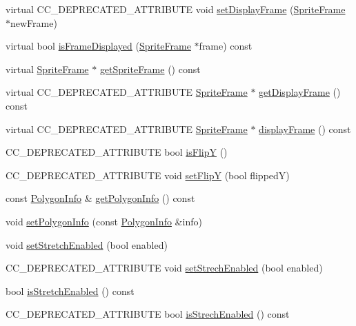 \begin{DoxyCompactItemize}
\item 
virtual C\+C\+\_\+\+D\+E\+P\+R\+E\+C\+A\+T\+E\+D\+\_\+\+A\+T\+T\+R\+I\+B\+U\+TE void \hyperlink{classSprite_adb32a70df269965d534e49600ab9ff13}{set\+Display\+Frame} (\hyperlink{classSpriteFrame}{Sprite\+Frame} $\ast$new\+Frame)
\item 
virtual bool \hyperlink{classSprite_a9fba3e039bf9d72552848a201b4a451f}{is\+Frame\+Displayed} (\hyperlink{classSpriteFrame}{Sprite\+Frame} $\ast$frame) const
\item 
virtual \hyperlink{classSpriteFrame}{Sprite\+Frame} $\ast$ \hyperlink{classSprite_a6921c3ed0ee8e8349e3581d8fbf496c2}{get\+Sprite\+Frame} () const
\item 
virtual C\+C\+\_\+\+D\+E\+P\+R\+E\+C\+A\+T\+E\+D\+\_\+\+A\+T\+T\+R\+I\+B\+U\+TE \hyperlink{classSpriteFrame}{Sprite\+Frame} $\ast$ \hyperlink{classSprite_a397ae5a00212e31172695b8faa4aff4e}{get\+Display\+Frame} () const
\item 
virtual C\+C\+\_\+\+D\+E\+P\+R\+E\+C\+A\+T\+E\+D\+\_\+\+A\+T\+T\+R\+I\+B\+U\+TE \hyperlink{classSpriteFrame}{Sprite\+Frame} $\ast$ \hyperlink{classSprite_afe9089c5db5d653709d63c943b6a6637}{display\+Frame} () const
\item 
C\+C\+\_\+\+D\+E\+P\+R\+E\+C\+A\+T\+E\+D\+\_\+\+A\+T\+T\+R\+I\+B\+U\+TE bool \hyperlink{classSprite_aed312876fd0527225526da4af119727b}{is\+FlipY} ()
\item 
C\+C\+\_\+\+D\+E\+P\+R\+E\+C\+A\+T\+E\+D\+\_\+\+A\+T\+T\+R\+I\+B\+U\+TE void \hyperlink{classSprite_a69358c4c56221ae9435a4c83074f0151}{set\+FlipY} (bool flippedY)
\item 
const \hyperlink{classPolygonInfo}{Polygon\+Info} \& \hyperlink{classSprite_a428649648496eb633fba0bd4bb2bc511}{get\+Polygon\+Info} () const
\item 
void \hyperlink{classSprite_a2ab8f707e76545845606c8de023d4f91}{set\+Polygon\+Info} (const \hyperlink{classPolygonInfo}{Polygon\+Info} \&info)
\item 
void \hyperlink{classSprite_a4f1659fc2090bfd0d849c707599ea7f3}{set\+Stretch\+Enabled} (bool enabled)
\item 
C\+C\+\_\+\+D\+E\+P\+R\+E\+C\+A\+T\+E\+D\+\_\+\+A\+T\+T\+R\+I\+B\+U\+TE void \hyperlink{classSprite_a17611e9c53231055f35bccd33d674bc9}{set\+Strech\+Enabled} (bool enabled)
\item 
bool \hyperlink{classSprite_a93f42a17bbaabec6399aab235477a4c4}{is\+Stretch\+Enabled} () const
\item 
C\+C\+\_\+\+D\+E\+P\+R\+E\+C\+A\+T\+E\+D\+\_\+\+A\+T\+T\+R\+I\+B\+U\+TE bool \hyperlink{classSprite_ab7af90fb9be0abea89d551213a789ad4}{is\+Strech\+Enabled} () const

\end{DoxyCompactItemize}
